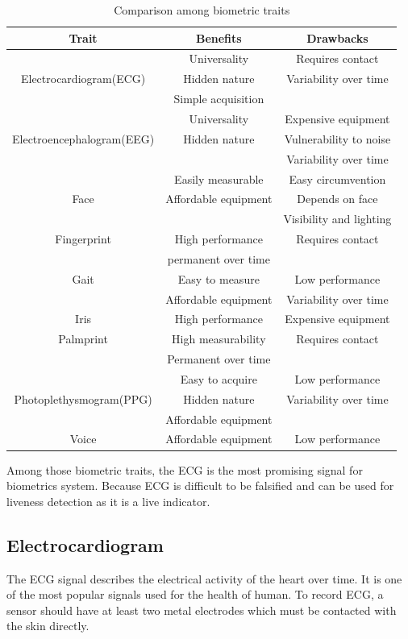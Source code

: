 \documentclass[a4paper,12pt]{article}
\begin{document}
\begin{table}

\centering
 \begin{tabular}{c c c} 
 Trait & Benefits & Drawbacks \\ [0.5ex] 
 \hline\hline
  & Universality & Requires contact \\ Electrocardiogram(ECG) & Hidden nature & Variability over time \\ & Simple acquisition & \\ 
 \hline
  & Universality & Expensive equipment \\ Electroencephalogram(EEG) & Hidden nature & Vulnerability to noise \\ &  & Variability over time \\ 
 \hline
  & Easily measurable & Easy circumvention \\ Face & Affordable equipment & Depends on face \\ & & Visibility and lighting \\ 
 \hline
  Fingerprint & High performance & Requires contact \\ & permanent over time & \\
 \hline
  Gait & Easy to measure & Low performance \\ & Affordable equipment & Variability over time \\
  \hline
  Iris & High performance & Expensive equipment \\
  \hline
  Palmprint & High measurability & Requires contact \\ & Permanent over time &  \\ 
  \hline
  & Easy to acquire & Low performance \\ Photoplethysmogram(PPG) & Hidden nature & Variability over time \\ & Affordable equipment & \\ 
  \hline
 Voice & Affordable equipment & Low performance \\ [1ex] 
 \hline
\end{tabular}
\caption{Comparison among biometric traits\autocite{Pinto:2018evolution}}
\label{tab:comparision}
\end{table}

Among those biometric traits, the ECG is the most promising signal for biometrics system\parencite{Pinto:2018evolution}. Because ECG is difficult to be falsified and can be used for liveness detection as it is a live indicator\parencite{Wang:2007analysis}. 

\subsection{Electrocardiogram}
The ECG signal describes the electrical activity of the heart over time. It is one of the most popular signals used for the health of human. To record ECG, a sensor should have at least two metal electrodes which must be contacted with the skin directly\parencite{Blasco:2018feasibility}.
\end{document}
